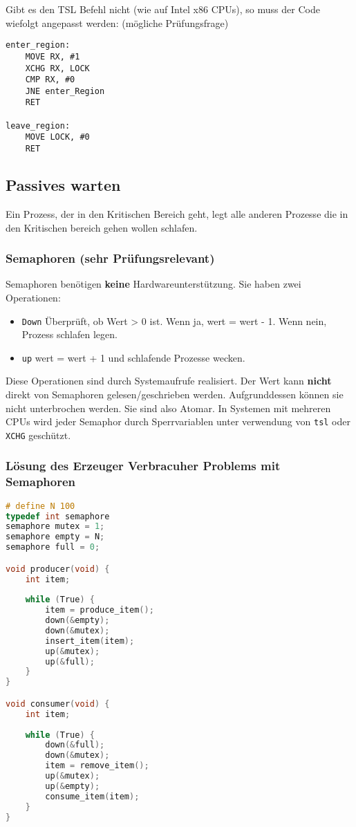 Gibt es den TSL Befehl nicht (wie auf Intel x86 CPUs), so muss der Code wiefolgt angepasst werden: (mögliche Prüfungsfrage)

\begin{lstlisting}[language={[x86masm]Assembler}]
enter_region:
    MOVE RX, #1
    XCHG RX, LOCK
    CMP RX, #0
    JNE enter_Region
    RET
    
leave_region:
    MOVE LOCK, #0
    RET 
\end{lstlisting}

\subsection{Passives warten}

Ein Prozess, der in den Kritischen Bereich geht, legt alle anderen Prozesse die in den Kritischen bereich gehen wollen schlafen.

\subsubsection{Semaphoren (sehr Prüfungsrelevant)}

Semaphoren benötigen \textbf{keine} Hardwareunterstützung. Sie haben zwei Operationen:

\begin{itemize}
    \item \texttt{Down} \newline Überprüft, ob Wert > 0 ist. Wenn ja, wert = wert - 1. Wenn nein, Prozess schlafen legen.
    \item \texttt{up} \newline wert = wert + 1 und schlafende Prozesse wecken.
\end{itemize}

Diese Operationen sind durch Systemaufrufe realisiert. Der Wert kann \textbf{nicht} direkt von Semaphoren gelesen/geschrieben werden. Aufgrunddessen können sie nicht unterbrochen werden. Sie sind also Atomar. In Systemen mit mehreren CPUs wird jeder Semaphor durch Sperrvariablen unter verwendung von \texttt{tsl} oder \texttt{XCHG} geschützt.

\subsubsection*{Lösung des Erzeuger Verbracuher Problems mit Semaphoren}

\begin{lstlisting}[language=C]
# define N 100
typedef int semaphore
semaphore mutex = 1;
semaphore empty = N;
semaphore full = 0;

void producer(void) {
    int item;
    
    while (True) {
        item = produce_item();
        down(&empty);
        down(&mutex);
        insert_item(item);
        up(&mutex);
        up(&full);
    }
} 

void consumer(void) {
    int item;
    
    while (True) {
        down(&full);
        down(&mutex);
        item = remove_item();
        up(&mutex);
        up(&empty);
        consume_item(item);
    }
}
\end{lstlisting}

